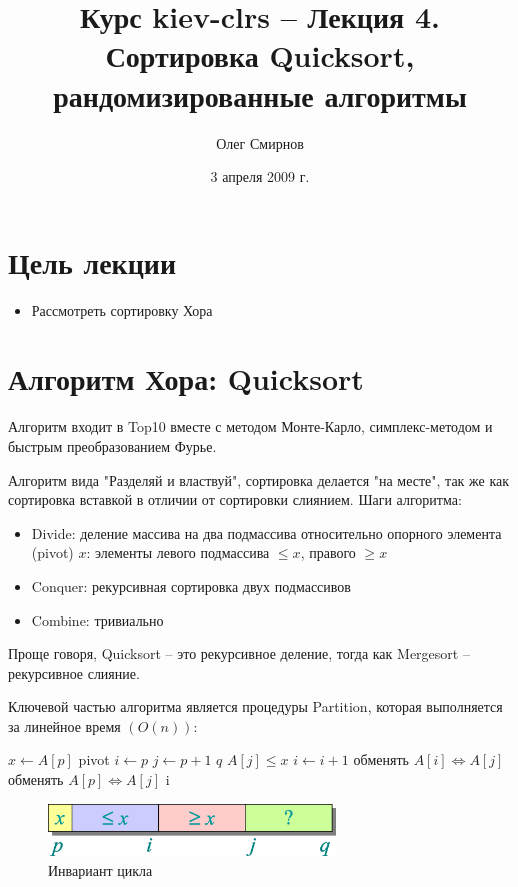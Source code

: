 \documentclass[11pt]{article}
\author{Олег Смирнов}
\title{Курс kiev-clrs -- Лекция 4. Сортировка Quicksort, рандомизированные алгоритмы}
\date{3 апреля 2009 г.}
\begin{document}
\maketitle
\tableofcontents

\newpage
\setlength{\parskip}{1ex plus 0.5ex minus 0.2ex}
\section{Цель лекции}
\begin{itemize}
\item Рассмотреть сортировку Хора
\
\end{itemize}

\section{Алгоритм Хора: Quicksort}

Алгоритм входит в Top10 вместе с методом Монте-Карло, симплекс-методом и быстрым преобразованием Фурье.

Алгоритм вида "Разделяй и властвуй", сортировка делается "на месте", так же как сортировка вставкой в отличии от сортировки слиянием. Шаги алгоритма:

\begin{itemize}
\item Divide: деление массива на два подмассива относительно опорного элемента (pivot) $x$: элементы левого подмассива $\leqslant x$, правого $\geqslant x$
\item Conquer: рекурсивная сортировка двух подмассивов
\item Combine: тривиально
\end{itemize}
Проще говоря, Quicksort -- это рекурсивное деление, тогда как Mergesort -- рекурсивное слияние.

Ключевой частью алгоритма является процедуры Partition, которая выполняется за линейное время $(O(n))$:

\begin{codebox}
\li	$x \gets A[p]$	\Comment pivot
\li	$i \gets p$
\li	\For $j \gets p+1$ \To $q$
\li		\Do \If $A[j] \leqslant x$
\li		\Then $i \gets i+1$
\li			обменять $A[i] \iff A[j]$
		\End
	\End
\li	обменять $A[p] \iff A[j]$
\li \Return i
\End
\end{codebox}

\begin{figure}[ht]
  \centering
  \includegraphics[width=3in]{lecture4/invariant.eps}
  \caption{Инвариант цикла}
  \label{fig:invariant}
\end{figure}
\end{document}

